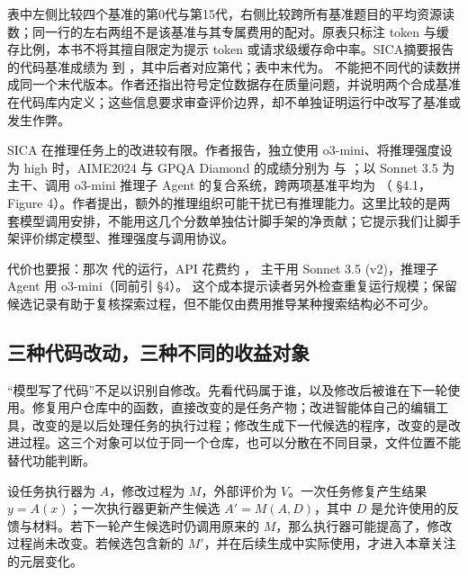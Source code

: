 \begin{sloppypar}
表中左侧比较四个基准的第0代与第15代，右侧比较跨所有基准题目的平均资源读数；同一行的左右两组不是该基准与其专属费用的配对。原表只标注 token 与缓存比例，本书不将其擅自限定为提示 token 或请求级缓存命中率。SICA摘要报告的代码基准成绩为  到 ，其中后者对应第代；表中末代为。
不能把不同代的读数拼成同一个末代版本。作者还指出符号定位数据存在质量问题，并说明两个合成基准在代码库内定义；这些信息要求审查评价边界，却不单独证明运行中改写了基准或发生作弊。
\end{sloppypar}

\begin{sloppypar}
SICA 在推理任务上的改进较有限。作者报告，独立使用 o3-mini、将推理强度设为 high 时，AIME2024 与 GPQA Diamond 的成绩分别为  与 ；以 Sonnet 3.5 为主干、调用 o3-mini 推理子 Agent 的复合系统，跨两项基准平均为 （\cite{sica-2504} §4.1，Figure 4）。作者提出，额外的推理组织可能干扰已有推理能力。这里比较的是两套模型调用安排，不能用这几个分数单独估计脚手架的净贡献；它提示我们让脚手架评价绑定模型、推理强度与调用协议。
\end{sloppypar}

\begin{sloppypar}
代价也要报：那次  代的运行，API 花费约 ，
主干用 Sonnet 3.5 (v2)，推理子 Agent 用 o3-mini（同前引 §4）。
这个成本提示读者另外检查重复运行规模；保留候选记录有助于复核探索过程，但不能仅由费用推导某种搜索结构必不可少。
\end{sloppypar}

\subsection{三种代码改动，三种不同的收益对象}
\label{sec:ch12-threeobjects}

“模型写了代码”不足以识别自修改。先看代码属于谁，以及修改后被谁在下一轮使用。修复用户仓库中的函数，直接改变的是任务产物；改进智能体自己的编辑工具，改变的是以后处理任务的执行过程；修改生成下一代候选的程序，改变的是改进过程。这三个对象可以位于同一个仓库，也可以分散在不同目录，文件位置不能替代功能判断。

设任务执行器为 $A$，修改过程为 $M$，外部评价为 $V$。一次任务修复产生结果 $y=A(x)$；一次执行器更新产生候选 $A'=M(A,D)$，其中 $D$ 是允许使用的反馈与材料。若下一轮产生候选时仍调用原来的 $M$，那么执行器可能提高了，修改过程尚未改变。若候选包含新的 $M'$，并在后续生成中实际使用，才进入本章关注的元层变化。

